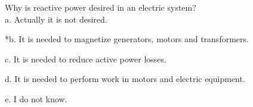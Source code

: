 
Why is reactive power desired in an electric system?\\

a. Actually it is not desired.

*b. It is needed to magnetize generators, motors and transformers.

c. It is needed to reduce active power losses.

d. It is needed to perform work in motors and electric equipment.

e. I do not know.\\
